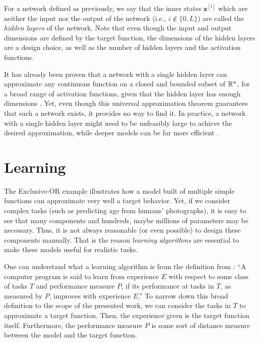 For a network defined as previously, we say that the inner states $\bm{z}^{[i]}$ which are neither the input nor the output of the network (i.e., $i\not\in \{0,L\}$) are called the \textit{hidden layers} of the network.
Note that even though the input and output dimensions are defined by the target function, the dimensions of the hidden layers are a design choice, as well as the number of hidden layers and the activation functions.

It has already been proven that a network with a single hidden layer can approximate any continuous function on a closed and bounded subset of $\mathbb{R}^n$, for a broad range of activation functions, given that the hidden layer has enough dimensions \cite{hornik_multilayer_1989,leshno_multilayer_1993}.
Yet, even though this universal approximation theorem guarantees that such a network exists, it provides no way to find it.
In practice, a network with a single hidden layer might need to be unfeasibly large to achieve the desired approximation, while deeper models can be far more efficient \cite{goodfellow_deep_2016}.

\section{Learning}

The Exclusive-OR example illustrates how a model built of multiple simple functions can approximate very well a target behavior.
Yet, if we consider complex tasks (such as predicting age from humans' photographs), it is easy to see that many components and hundreds, maybe millions of parameters may be necessary\footnotemark.
Thus, it is not always reasonable (or even possible) to design these components manually.
That is the reason \textit{learning algorithms} are essential to make these models useful for realistic tasks.


One can understand what a learning algorithm is from the definition from \textcite{mitchell_machine_1997}:
``A computer program is said to learn from experience $E$ with respect to some class of tasks $T$ and performance measure $P$, if its performance at tasks in $T$, as measured by $P$, improves with experience $E$.''
To narrow down this broad definition to the scope of the presented work, we can consider the tasks in $T$ to approximate a target function.
Then, the experience given is the target function itself.
Furthermore, the performance measure $P$ is some sort of distance measure between the model and the target function.

